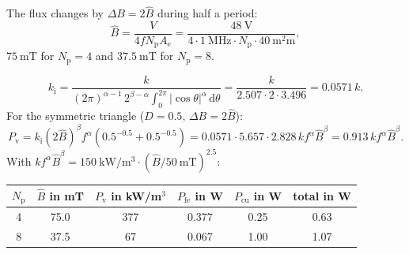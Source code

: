 


\begin{solutionblock}
	The flux changes by $\Delta B=2\hat{B}$ during half a period:
	\begin{equation}
		\hat{B}=\frac{V}{4fN_\mathrm{p}A_\mathrm{e}}=\frac{\SI{48}{\volt}}{4\cdot\SI{1}{\mega\hertz}\cdot N_\mathrm{p}\cdot\SI{40}{\square\milli\metre}},
	\end{equation}
	$\SI{75}{\milli\tesla}$ for $N_\mathrm{p}=4$ and $\SI{37.5}{\milli\tesla}$ for $N_\mathrm{p}=8$.
\end{solutionblock}


\begin{solutionblock}
	\begin{equation}
		k_\mathrm{i}=\frac{k}{(2\pi)^{\alpha-1}\,2^{\beta-\alpha}\int_0^{2\pi}|\cos\theta|^{\alpha}\,\mathrm{d}\theta}=\frac{k}{2.507\cdot2\cdot3.496}=0.0571\,k.
	\end{equation}
	For the symmetric triangle ($D=0.5$, $\Delta B=2\hat{B}$):
	\begin{equation}
		P_\mathrm{v}=k_\mathrm{i}(2\hat{B})^{\beta}f^{\alpha}\left(0.5^{-0.5}+0.5^{-0.5}\right)=0.0571\cdot5.657\cdot2.828\,kf^{\alpha}\hat{B}^{\beta}=0.913\,kf^{\alpha}\hat{B}^{\beta}.
	\end{equation}
	With $kf^{\alpha}\hat{B}^{\beta}=\SI{150}{\kilo\watt\per\cubic\metre}\cdot(\hat{B}/\SI{50}{\milli\tesla})^{2.5}$:
	\begin{solutiontable}[ht]
		\centering
		\begin{tabular}{|c|c|c|c|c|c|}
			\hline
			$N_\mathrm{p}$ & $\hat{B}$ in mT & $P_\mathrm{v}$ in kW/m$^3$ & $P_\mathrm{fe}$ in W & $P_\mathrm{cu}$ in W & total in W \\
			\hline
			4              & 75.0            & 377                        & 0.377                & 0.25                 & 0.63       \\
			8              & 37.5            & 67                         & 0.067                & 1.00                 & 1.07       \\
			\hline
		\end{tabular}
	\end{solutiontable}
\end{solutionblock}


